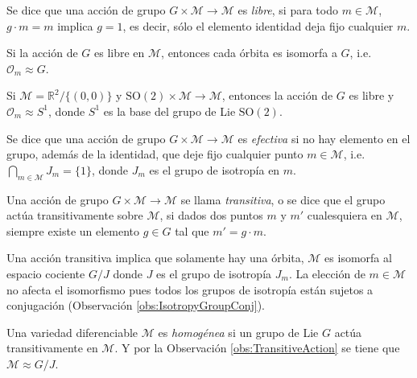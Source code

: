 \begin{mydef}  \cite{Kobayashi}
Se dice que una acci\'{o}n de grupo $G \times \mathcal{M} \longrightarrow \mathcal{M}$ es \emph{libre}, si para todo $m \in \mathcal{M}$, $g \cdot m = m$ implica $g = 1$, es decir, s\'{o}lo el elemento identidad deja fijo cualquier $m$.
\end{mydef}

\begin{obs}
Si la acci\'{o}n de $G$ es libre en $\mathcal{M}$, entonces cada \'{o}rbita es isomorfa a $G$, i.e. $\mathcal{O}_{m} \approx G$.
%
\begin{ex}
Si $\mathcal{M} = \mathbb{R}^{2}/\{(0,0)\}$ y $\mathrm{SO}(2) \times \mathcal{M} \rightarrow \mathcal{M}$, entonces la acci\'{o}n de $G$ es libre y $\mathcal{O}_{m} \approx S^{1}$, donde $S^{1}$ es la base del grupo de Lie $\mathrm{SO}(2)$.
\end{ex}
\end{obs}

\begin{mydef}  \cite{Kobayashi}
Se dice que una acci\'{o}n de grupo $G \times \mathcal{M} \longrightarrow \mathcal{M}$ es \emph{efectiva} si no hay elemento en el grupo, adem\'{a}s de la identidad, que deje fijo cualquier punto $m \in \mathcal{M}$, i.e. $\bigcap\limits_{m \in \mathcal{M}} J_{m} = \{1\}$, donde $J_{m}$ es el grupo de isotrop\'{i}a en $m$.
\end{mydef}

\begin{mydef}  \cite{Kobayashi2}
Una acci\'{o}n de grupo $G \times \mathcal{M} \longrightarrow \mathcal{M}$ se llama \emph{transitiva}, o se dice que el grupo act\'{u}a transitivamente sobre $\mathcal{M}$, si dados dos puntos $m$ y $m'$ cualesquiera en $\mathcal{M}$, siempre existe un elemento $g \in G$ tal que $m' = g \cdot m$.
\end{mydef}

\begin{obs}
\label{obs:TransitiveAction}
Una acci\'{o}n transitiva implica que solamente hay una \'{o}rbita, $\mathcal{M}$ es isomorfa al espacio cociente $G/J$ donde $J$ es el grupo de isotrop\'{i}a $J_{m}$. La elecci\'{o}n de $m \in \mathcal{M}$ no afecta el isomorfismo pues todos los grupos de isotrop\'{i}a est\'{a}n sujetos a conjugaci\'{o}n (Observaci\'{o}n \ref{obs:IsotropyGroupConj}).
\end{obs}

\begin{mydef}  \cite{Kobayashi2}
Una variedad diferenciable $\mathcal{M}$ es \emph{homog\'{e}nea} si un grupo de Lie $G$ act\'{u}a transitivamente en $\mathcal{M}$. Y por la Observaci\'{o}n \ref{obs:TransitiveAction} se tiene que $\mathcal{M} \approx G/J$.
\end{mydef}

